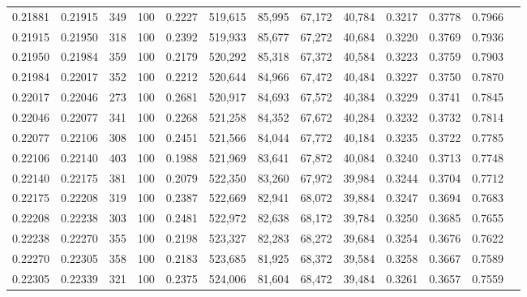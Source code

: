 \begin{tabular}{rrrrrrrrrrrrr}
0.21881 & 0.21915 &   349 & 100 &                                     0.2227 & 519,615 &  85,995 &  67,172 &  40,784 & 0.3217 & 0.3778 & 0.7966 \\
0.21915 & 0.21950 &   318 & 100 &                                     0.2392 & 519,933 &  85,677 &  67,272 &  40,684 & 0.3220 & 0.3769 & 0.7936 \\
0.21950 & 0.21984 &   359 & 100 &                                     0.2179 & 520,292 &  85,318 &  67,372 &  40,584 & 0.3223 & 0.3759 & 0.7903 \\
0.21984 & 0.22017 &   352 & 100 &                                     0.2212 & 520,644 &  84,966 &  67,472 &  40,484 & 0.3227 & 0.3750 & 0.7870 \\
0.22017 & 0.22046 &   273 & 100 &                                     0.2681 & 520,917 &  84,693 &  67,572 &  40,384 & 0.3229 & 0.3741 & 0.7845 \\
0.22046 & 0.22077 &   341 & 100 &                                     0.2268 & 521,258 &  84,352 &  67,672 &  40,284 & 0.3232 & 0.3732 & 0.7814 \\
0.22077 & 0.22106 &   308 & 100 &                                     0.2451 & 521,566 &  84,044 &  67,772 &  40,184 & 0.3235 & 0.3722 & 0.7785 \\
0.22106 & 0.22140 &   403 & 100 &                                     0.1988 & 521,969 &  83,641 &  67,872 &  40,084 & 0.3240 & 0.3713 & 0.7748 \\
0.22140 & 0.22175 &   381 & 100 &                                     0.2079 & 522,350 &  83,260 &  67,972 &  39,984 & 0.3244 & 0.3704 & 0.7712 \\
0.22175 & 0.22208 &   319 & 100 &                                     0.2387 & 522,669 &  82,941 &  68,072 &  39,884 & 0.3247 & 0.3694 & 0.7683 \\
0.22208 & 0.22238 &   303 & 100 &                                     0.2481 & 522,972 &  82,638 &  68,172 &  39,784 & 0.3250 & 0.3685 & 0.7655 \\
0.22238 & 0.22270 &   355 & 100 &                                     0.2198 & 523,327 &  82,283 &  68,272 &  39,684 & 0.3254 & 0.3676 & 0.7622 \\
0.22270 & 0.22305 &   358 & 100 &                                     0.2183 & 523,685 &  81,925 &  68,372 &  39,584 & 0.3258 & 0.3667 & 0.7589 \\
0.22305 & 0.22339 &   321 & 100 &                                     0.2375 & 524,006 &  81,604 &  68,472 &  39,484 & 0.3261 & 0.3657 & 0.7559 \\

\end{tabular}
